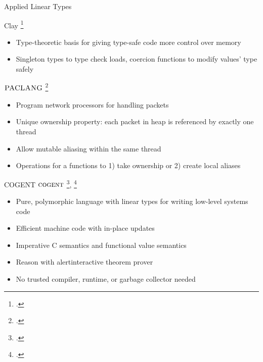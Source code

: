 \documentclass[aspectratio=169]{beamer}
\begin{document}

\begin{frame}{Applied Linear Types}
\footnotesize{
Clay \footcite{hawblitzel_low-level_2004}
  \begin{itemize}
    \item Type-theoretic basis for giving type-safe code more control over memory
    \item Singleton types to type check loads, coercion functions to modify values' type safely
  \end{itemize}

\pause

$\textsc{PACLANG}$ \footcite{ennals_linear_2004} %
  \begin{itemize}
    \item Program network processors for handling packets %
    \item Unique ownership property: each packet in heap is referenced by exactly one thread
    \item Allow mutable aliasing within the same thread
    \item Operations for a functions to 1) take ownership or 2) create local aliases
  \end{itemize}
}
\end{frame}

\begin{frame}{COGENT}
$\textsc{cogent}$ \footcite{amani_cogent:_2016}, \footcite{oconnor_cogent:_2016}
    \begin{itemize}[<+->]
        \item Pure, polymorphic language with linear types for writing low-level systems code 
        \item Efficient machine code with in-place updates
        \item Imperative C semantics and functional value semantics 
        \item Reason with alert{interactive theorem prover}
        \item No trusted compiler, runtime, or garbage collector needed
    \end{itemize}
\end{frame}
\end{document}

